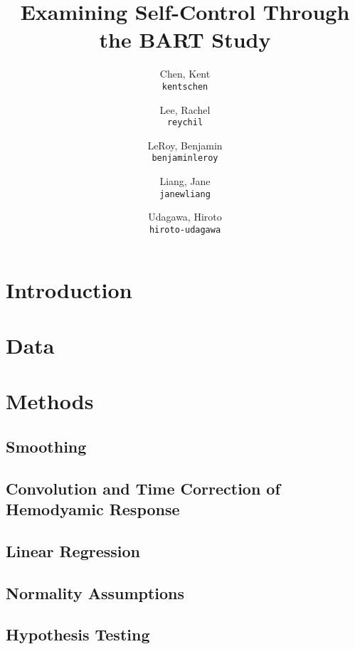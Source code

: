 \documentclass[11pt]{article}
\title{Examining Self-Control Through the BART Study}
\author{
  Chen, Kent\\
  \texttt{kentschen}
  \and
  Lee, Rachel\\
  \texttt{reychil}
  \and
  LeRoy, Benjamin\\
  \texttt{benjaminleroy}
  \and
  Liang, Jane\\
  \texttt{janewliang}
  \and
  Udagawa, Hiroto\\
  \texttt{hiroto-udagawa}
}
\begin{document}
\maketitle

\abstract{}

\section{Introduction} \label{introduction}
	

\section{Data} \label{data}

	
	
\section{Methods} \label{methods}
	\subsection{Smoothing}
	
		

	\subsection{Convolution and Time Correction of Hemodyamic Response}

		
		
	\subsection{Linear Regression}
	
		

	\subsection{Normality Assumptions}
	
		
		
	\subsection{Hypothesis Testing} \label{hypothesis_testing}
	
\end{document}
